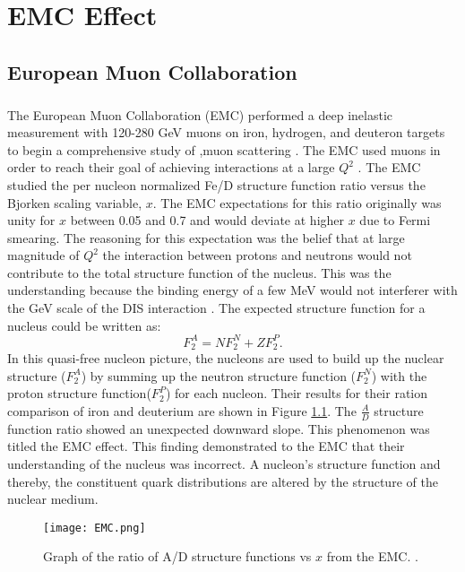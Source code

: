 \chapter{EMC Effect}	
\section{European Muon Collaboration}\label{sec:EMC}
\paragraph{}The European Muon Collaboration (EMC) performed a deep inelastic measurement with 120-280 GeV muons on iron, hydrogen, and deuteron targets to begin a comprehensive study of ,muon scattering \cite{challenge, Norton}. The EMC used muons in order to reach their goal of achieving interactions at a large $Q^2$ \cite{seelyth}. The EMC studied the per nucleon normalized Fe/D structure function ratio versus the Bjorken scaling variable, $x$. The EMC expectations for this ratio originally was unity for $x$ between 0.05 and 0.7 and would deviate at higher $x$ due to Fermi smearing\cite{CC}. The reasoning for this expectation was the belief that at large magnitude of $Q^2$ the interaction between protons and neutrons would not contribute to the total structure function of the nucleus. This was the understanding because the binding energy of a few MeV would not interferer with the GeV scale of the DIS interaction \cite{Ajth}. The expected structure function for a nucleus could be written as:
\begin{equation}
F_2^A = N F_2^N + ZF_2^P.
\end{equation}
In this quasi-free nucleon picture, the nucleons are used to build up the nuclear structure ($F_2^A$) by summing up the neutron structure function ($F_2^N$) with the proton structure function($F_2^P$) for each nucleon. Their results for their ration comparison of iron and deuterium are shown in Figure \ref{EMCOld}. The $\frac{A}{D}$ structure function ratio showed an unexpected downward slope. This phenomenon was titled the EMC effect. This finding demonstrated to the EMC that their understanding of the nucleus was incorrect. A nucleon's structure function and thereby, the constituent quark distributions are altered by the structure of the nuclear medium. 
\begin{figure}[h]
	\centering
	\caption{ Graph of the ratio of A/D structure functions vs $x$ from the EMC. \cite{CC,EM}.}
	\label{EMCOld}
	\texttt{[image: EMC.png]} 
\end{figure} 
